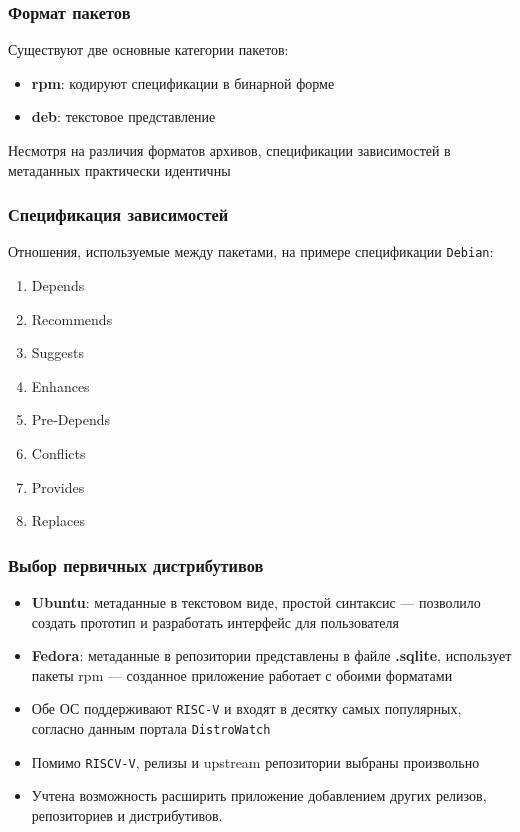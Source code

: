 \documentclass{beamer}
\begin{document}
\begin{frame}
	\frametitle{Формат пакетов}
	Существуют две основные категории пакетов:
	\begin{itemize}
		\item \textbf{rpm}: кодируют спецификации в бинарной форме
		\item \textbf{deb}: текстовое представление
	\end{itemize}

	Несмотря на различия форматов архивов, спецификации зависимостей в метаданных практически идентичны
\end{frame}

\begin{frame}
	\frametitle{Спецификация зависимостей}
	Отношения, используемые между пакетами, на примере спецификации \texttt{Debian}:
	\begin{enumerate}
		\item Depends
		\item Recommends
		\item Suggests
		\item Enhances
		\item Pre-Depends
		\item Conflicts
		\item Provides
		\item Replaces
	\end{enumerate}
\end{frame}

\begin{frame}
	\frametitle{Выбор первичных дистрибутивов}
	\begin{itemize}
		\item \textbf{Ubuntu}: метаданные в текстовом виде, простой синтаксис --- позволило создать прототип и разработать интерфейс для пользователя
		\item \textbf{Fedora}: метаданные в репозитории представлены в файле \textbf{.sqlite}, использует пакеты rpm --- созданное приложение работает с обоими форматами
		\item Обе ОС поддерживают \texttt{RISC-V} и входят в десятку самых популярных, согласно данным портала \texttt{DistroWatch}
		\item Помимо \texttt{RISCV-V}, релизы и upstream репозитории выбраны произвольно
		\item Учтена возможность расширить приложение добавлением других релизов, репозиториев и дистрибутивов.
	\end{itemize}
\end{frame}
\end{document}
